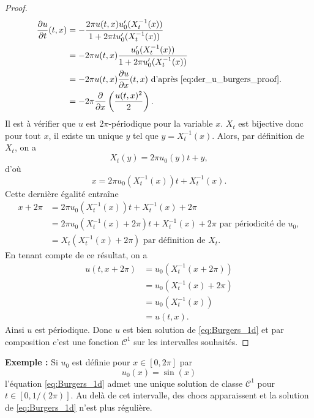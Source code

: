 \begin{proof}
\begin{align*}
\dfrac{\partial u}{\partial t}(t,x) & = - \dfrac{2 \pi u(t,x) u_0'(X_t^{-1}(x))}{1 + 2 \pi t u_0'(X_t^{-1}(x))} \\
	& = - 2 \pi u(t,x) \dfrac{u_0'(X_t^{-1}(x))}{1 + 2 \pi u_0'(X_t^{-1}(x))} \\
	& = - 2 \pi u(t,x) \dfrac{\partial u}{\partial x}(t,x) \text{ d'après \eqref{eq:der_u_burgers_proof}.} \\
	& = - 2 \pi \dfrac{\partial}{\partial x}\left( \dfrac{u(t,x)^2}{2} \right).
\end{align*}
Il est à vérifier que $u$ est $2 \pi$-périodique pour la variable $x$.
$X_t$ est bijective donc pour tout $x$, il existe un unique $y$ tel que $y = X_t^{-1}(x)$. Alors, par définition de $X_t$, on a
\begin{equation}
X_t(y) = 2 \pi u_0(y)t + y,
\end{equation}
d'où
\begin{equation}
x = 2 \pi u_0(X_t^{-1}(x))t + X_t^{-1}(x).
\end{equation}
Cette dernière égalité entraîne 
\begin{align*}
x + 2 \pi & = 2 \pi u_0( X_t^{-1}(x))t + X_t^{-1}(x) + 2 \pi \\
	& = 2 \pi u_0( X_t^{-1}(x) + 2 \pi)t + X_t^{-1}(x) + 2 \pi \text{ par périodicité de } u_0,\\
	& = X_t(X_t^{-1}(x) + 2 \pi) \text{ par définition de } X_t.
\end{align*}
En tenant compte de ce résultat, on a
\begin{align*}
u(t,x+ 2 \pi) & = u_0(X_t^{-1}(x+2\pi)) \\
	& = u_0(X_t^{-1}(x) + 2 \pi) \\
	& = u_0(X_t^{-1}(x)) \\
	& = u(t,x).
\end{align*}
Ainsi $u$ est périodique. Donc $u$ est bien solution de \eqref{eq:Burgers_1d} et par composition c'est une fonction $\mathcal{C}^1$ sur les intervalles souhaités.
\end{proof}

\textbf{Exemple : }
Si $u_0$ est définie pour $x \in [0, 2 \pi]$ par 
\begin{equation}
u_0(x) = \sin (x)
\label{eq:burgers_expemple2}
\end{equation}
l'équation \eqref{eq:Burgers_1d} admet une unique solution de classe $\mathcal{C}^1$ pour $t \in [0, 1/(2\pi)]$. Au delà de cet intervalle, des chocs apparaissent et la solution de \eqref{eq:Burgers_1d} n'est plus régulière.


